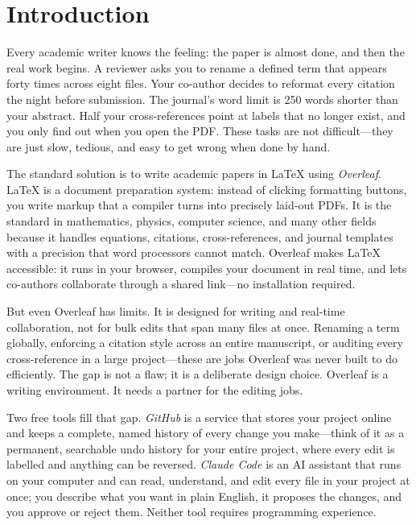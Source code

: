 \section{Introduction}

Every academic writer knows the feeling: the paper is almost done, and then the real work begins. A reviewer asks you to rename a defined term that appears forty times across eight files. Your co-author decides to reformat every citation the night before submission. The journal's word limit is 250 words shorter than your abstract. Half your cross-references point at labels that no longer exist, and you only find out when you open the PDF. These tasks are not difficult---they are just slow, tedious, and easy to get wrong when done by hand.

The standard solution is to write academic papers in \LaTeX{} using \textit{Overleaf}. \LaTeX{} is a document preparation system: instead of clicking formatting buttons, you write markup that a compiler turns into precisely laid-out PDFs. It is the standard in mathematics, physics, computer science, and many other fields because it handles equations, citations, cross-references, and journal templates with a precision that word processors cannot match. Overleaf makes \LaTeX{} accessible: it runs in your browser, compiles your document in real time, and lets co-authors collaborate through a shared link---no installation required.

But even Overleaf has limits. It is designed for writing and real-time collaboration, not for bulk edits that span many files at once. Renaming a term globally, enforcing a citation style across an entire manuscript, or auditing every cross-reference in a large project---these are jobs Overleaf was never built to do efficiently. The gap is not a flaw; it is a deliberate design choice. Overleaf is a writing environment. It needs a partner for the editing jobs.

Two free tools fill that gap. \textit{GitHub} is a service that stores your project online and keeps a complete, named history of every change you make---think of it as a permanent, searchable undo history for your entire project, where every edit is labelled and anything can be reversed. \textit{Claude Code} is an AI assistant that runs on your computer and can read, understand, and edit every file in your project at once; you describe what you want in plain English, it proposes the changes, and you approve or reject them. Neither tool requires programming experience.

